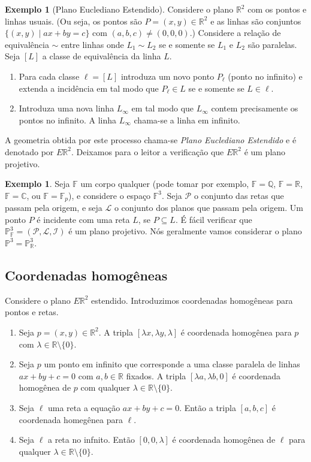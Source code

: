 \documentclass[12pt]{amsart}
\newcommand{\F}{\mathbb F}
\renewcommand{\L}{\mathbb L}
\newcommand{\Q}{\mathbb Q}
\newcommand{\C}{\mathbb C}
\newcommand{\R}{\mathbb R}
\theoremstyle{definition}
\newtheorem{example}[theorem]{Exemplo}
\renewcommand{\P}{\mathcal P}
\renewcommand{\L}{\mathcal L}
\newcommand{\I}{\mathcal I}
\newcommand{\PP}{\mathbb P}
\begin{document}
\begin{example}[Plano Euclediano Estendido]
    Considere o plano $\R^2$ com os pontos e linhas usuais. (Ou seja, os pontos são $P=(x,y)\in\R^2$ e as linhas 
    são conjuntos $\{(x,y)\mid ax+by=c\}$ com $(a,b,c)\neq (0,0,0)$.)
    Considere a relação de equivalência $\sim$ entre linhas 
    onde $L_1\sim L_2$ se e somente se $L_1$ e $L_2$ são paralelas. 
    Seja $[L]$ a classe de equivalência da linha $L$. 
    \begin{enumerate}
        \item Para cada classe $\ell=[L]$ introduza um novo ponto $P_\ell$ (ponto no infinito) e extenda 
    a incidência em tal modo que  $P_\ell\in L$ se e somente se $L\in \ell$.
    \item Introduza uma nova linha $L_\infty$ em tal modo que $L_\infty$ contem precisamente os pontos no infinito. A linha $L_\infty$ chama-se a linha em infinito.
    \end{enumerate}    
    A geometria obtida por este processo chama-se 
    \emph{Plano Euclediano Estendido} e é denotado por $E\R^2$. Deixamos para o leitor a verificação que $E\R^2$ é um plano projetivo.
\end{example}

\begin{example}
    Seja $\F$ um corpo qualquer (pode tomar por exemplo, $\F=\Q$, $\F=\R$, $\F=\C$, ou $\F=\F_p$), e considere 
    o espaço $\F^3$. Seja $\P$ o conjunto das retas que passam pela origem, e seja $\L$ o conjunto dos planos que passam pela origem. Um ponto $P$ é incidente com uma reta $L$, se $P\subseteq L$. É fácil verificar que 
    $\PP^3_\F=(\P,\L,\I)$ é um plano projetivo. Nós geralmente vamos considerar o plano $\PP^3=\PP^3_\R$. 
\end{example}

\subsection{Coordenadas homogêneas}
Considere o plano $E\R^2$ estendido. Introduzimos coordenadas homogêneas para pontos e retas.
\begin{enumerate}
\item Seja $p=(x,y)\in\R^2$. A tripla $[\lambda x,\lambda y,\lambda]$ 
é coordenada homogênea para $p$ com $\lambda\in\R\setminus\{0\}$. 
\item Seja $p$ um ponto em infinito que corresponde a uma classe paralela de linhas $ax+by+c=0$ com $a,b\in\R$ 
fixados. A tripla $[\lambda a,\lambda b,0]$ é coordenada homogênea de $p$ com qualquer 
$\lambda\in\R\setminus\{0\}$. 
\item Seja $\ell$ uma reta a equação $ax+by+c=0$. Então a tripla $[a,b,c]$ é coordenada homegênea para $\ell$. 
\item Seja $\ell$ a reta no infnito. Então $[0,0,\lambda]$ é coordenada homogênea de $\ell$ para qualquer 
$\lambda\in\R\setminus\{0\}$. 
\end{enumerate}
\end{document}
